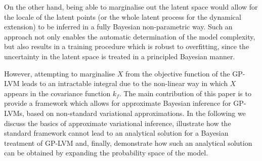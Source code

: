 






On the other hand, being able to marginalise out the latent space would allow for the locale
of the latent points (or the whole latent process for the dynamical extension)
to be inferred in a fully Bayesian non-parametric way. Such an approach not only enables
the automatic determination of the model complexity, but also results in a training procedure which is robust 
to overfitting, since the uncertainty in the latent space is treated in a principled Bayesian manner.

However, attempting to marginalise $X$ from the objective function of the GP-LVM leads to an
intractable integral due to the non-linear way in which $X$ appears in the covariance function $k_f$.
The main contribution of this paper is to provide a framework which allows for approximate
Bayesian inference for GP-LVMs, based on non-standard variational approximations.
In the following we discuss the basics of approximate variational inference, illustrate how the standard
framework cannot lead to an analytical solution for a Bayesian treatment of GP-LVM and, finally, demonstrate
how such an analytical solution can be obtained by expanding the probability space of the model.



